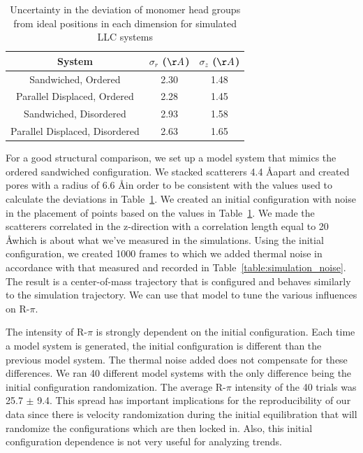 \documentclass{article}
\begin{document}
  \begin{table}[!htb]
  \centering
  \begin{tabular}{c c c}
  \toprule
  System                         &   $\sigma_r$ ($\AA$) &   $\sigma_z$ ($\AA$) \\
  \midrule
  Sandwiched, Ordered            &      2.30            &     1.48             \\
  Parallel Displaced, Ordered    &      2.28            &     1.45             \\
  Sandwiched, Disordered         &      2.93            &     1.58             \\
  Parallel Displaced, Disordered &      2.63            &     1.65             \\
  \bottomrule
  \end{tabular}
  \caption{Uncertainty in the deviation of monomer head groups from ideal 
          positions in each dimension for simulated LLC systems}\label{table:com_sigmas}
  \end{table}

  For a good structural comparison, we set up a model system that mimics the
  ordered sandwiched configuration. We stacked scatterers 4.4 \AA apart and
  created pores with a radius of 6.6 \AA in order to be consistent with the
  values used to calculate the deviations in Table~\ref{table:com_sigmas}. We
  created an initial configuration with noise in the placement of points based on
  the values in Table~\ref{table:com_sigmas}. We made the scatterers correlated
  in the z-direction with a correlation length equal to 20 \AA which is about
  what we've measured in the simulations. Using the initial configuration, we
  created 1000 frames to which we added thermal noise in accordance with that
  measured and recorded in Table~\ref{table:simulation_noise}. The result is a
  center-of-mass trajectory that is configured and behaves similarly to the
  simulation trajectory. We can use that model to tune the various influences
  on R-$\pi$.

  The intensity of R-$\pi$ is strongly dependent on the initial configuration.
  Each time a model system is generated, the initial configuration is different
  than the previous model system. The thermal noise added does not compensate for
  these differences. We ran 40 different model systems with the only difference
  being the initial configuration randomization. The average R-$\pi$ intensity of
  the 40 trials was 25.7 $\pm$ 9.4. This spread has important implications for
  the reproducibility of our data since there is velocity randomization during
  the initial equilibration that will randomize the configurations which are 
  then locked in. Also, this initial configuration dependence is not
  very useful for analyzing trends. 
\end{document}
